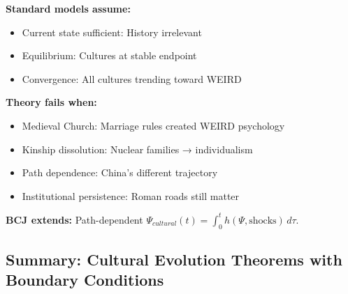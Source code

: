 \begin{tcolorbox}[colback=red!5!white, colframe=red!75!black,
    title=Boundary Condition: Where Ahistorical Models Fail]
\textbf{Standard models assume:}
\begin{itemize}[nosep]
\item Current state sufficient: History irrelevant
\item Equilibrium: Cultures at stable endpoint
\item Convergence: All cultures trending toward WEIRD
\end{itemize}

\textbf{Theory fails when:}
\begin{itemize}[nosep]
\item Medieval Church: Marriage rules created WEIRD psychology
\item Kinship dissolution: Nuclear families → individualism
\item Path dependence: China's different trajectory
\item Institutional persistence: Roman roads still matter
\end{itemize}

\textbf{BCJ extends:} Path-dependent $\Psi_{cultural}(t) = \int_0^t h(\Psi, \text{shocks}) \, d\tau$.
\end{tcolorbox}


\subsection{Summary: Cultural Evolution Theorems with Boundary Conditions}

